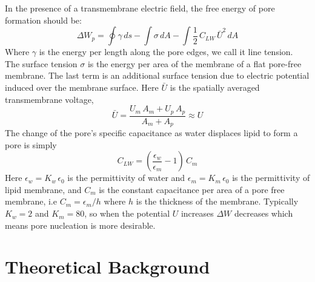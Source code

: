 \documentclass[english,12pt]{article}
\begin{document}
In the presence of a transmembrane electric field, the free energy of pore formation should be:
\begin{equation}
\Delta W_{p} = \oint\gamma\,ds - \int\sigma\,dA-\int\frac{1}{2}\,C_{LW}\,\bar{U}^{2}\,dA 
\label{eqn:poreenergy}
\end{equation}
Where $\gamma$ is the energy per length along the pore edges, we call it line tension. The surface tension $\sigma$ is the energy per area of the membrane of a flat pore-free membrane. The last term is an additional surface tension due to electric potential induced over the membrane surface. Here $\bar{U}$ is the spatially averaged transmembrane voltage, 
\begin{equation}
\bar{U}=\frac{U_m\,A_m+U_p\,A_p}{A_m+A_p}\approx U
\end{equation}
The change of the pore's specific capacitance as water displaces lipid to form a pore is simply 
\begin{equation}
C_{LW}=\left(\frac{\epsilon_w}{\epsilon_m}-1\right)\,C_m
\end{equation}
Here $\epsilon_w=K_w\,\epsilon_0$ is the permittivity of water and $\epsilon_m=K_m\,\epsilon_0$ is the permittivity of lipid membrane, and $C_m$ is the constant capacitance per area of a pore free membrane, i.e $C_m=\epsilon_m/h$ where $h$ is the thickness of the membrane. Typically $K_w=2$ and $K_m=80$, so when the potential $U$ increases $\Delta W$ decreases which means pore nucleation is more desirable.


\section{Theoretical Background}
\end{document}
